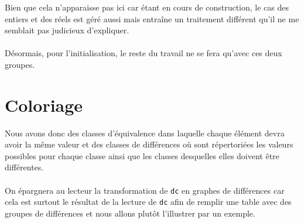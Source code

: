 \documentclass{memoir}
\begin{document}
			Bien que cela n'apparaisse pas ici car étant en cours de construction, le cas des entiers et des réels est géré aussi mais entraîne un traitement différent qu'il ne me semblait pas judicieux d'expliquer.
			
			\paragraph{} Désormais, pour l'initialisation, le reste du travail ne se fera qu'avec ces deux groupes. 
			
		\section{Coloriage}
		\label{sec:color}
			
			Nous avons donc des classes d'équivalence dans laquelle chaque élément devra avoir la même valeur et des classes de différences où sont répertoriées les valeurs possibles pour chaque classe ainsi que les classes desquelles elles doivent être différentes. 
		
		\paragraph{} On épargnera au lecteur la transformation de \texttt{dc} en graphes de différences car cela est surtout le résultat de la lecture de \texttt{dc} afin de remplir une table avec des groupes de différences et nous allons plutôt l'illustrer par un exemple.
		
\end{document}
